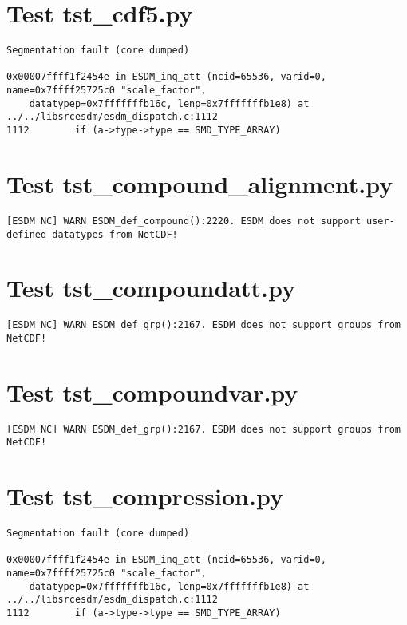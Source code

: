 \section{Test tst\_cdf5.py}

\begin{verbatim}
Segmentation fault (core dumped)

0x00007ffff1f2454e in ESDM_inq_att (ncid=65536, varid=0, name=0x7ffff25725c0 "scale_factor",
    datatypep=0x7fffffffb16c, lenp=0x7fffffffb1e8) at ../../libsrcesdm/esdm_dispatch.c:1112
1112	    if (a->type->type == SMD_TYPE_ARRAY)
\end{verbatim}

\section{Test tst\_compound\_alignment.py}

\begin{verbatim}
[ESDM NC] WARN ESDM_def_compound():2220. ESDM does not support user-defined datatypes from NetCDF!
\end{verbatim}

\section{Test tst\_compoundatt.py}

\begin{verbatim}
[ESDM NC] WARN ESDM_def_grp():2167. ESDM does not support groups from NetCDF!
\end{verbatim}

\section{Test tst\_compoundvar.py}

\begin{verbatim}
[ESDM NC] WARN ESDM_def_grp():2167. ESDM does not support groups from NetCDF!
\end{verbatim}

\section{Test tst\_compression.py}

\begin{verbatim}
Segmentation fault (core dumped)

0x00007ffff1f2454e in ESDM_inq_att (ncid=65536, varid=0, name=0x7ffff25725c0 "scale_factor",
    datatypep=0x7fffffffb16c, lenp=0x7fffffffb1e8) at ../../libsrcesdm/esdm_dispatch.c:1112
1112	    if (a->type->type == SMD_TYPE_ARRAY)
\end{verbatim}

